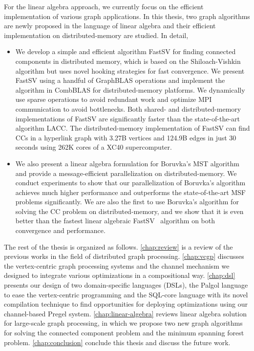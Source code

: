 \documentclass{sokendai_thesis} %
\newcommand{\boruvka}[0]{Boruvka}
\begin{document}
For the linear algebra approach, we currently focus on the efficient implementation of various graph applications.
In this thesis, two graph algorithms are newly proposed in the language of linear algebra and their efficient implementation on distributed-memory are studied. In detail,
\begin{itemize}
\item
  We develop a simple and efficient algorithm FastSV for finding connected components in distributed memory, which is based on the Shiloach-Vishkin algorithm but uses novel hooking strategies for fast convergence.
  We present FastSV using a handful of GraphBLAS operations and implement the algorithm in CombBLAS for distributed-memory platforms.
  We dynamically use sparse operations to avoid redundant work and optimize MPI communication to avoid bottlenecks.
  Both shared- and distributed-memory implementations of FastSV are significantly faster than the state-of-the-art algorithm LACC.
  The distributed-memory implementation of FastSV can find CCs in a hyperlink graph with 3.27B vertices and 124.9B edges in just $30$ seconds using 262K cores of a XC40 supercomputer. 

\item
  We also present a linear algebra formulation for \boruvka{}'s MST algorithm and provide a message-efficient parallelization on distributed-memory.
  We conduct experiments to show that our parallelization of \boruvka{}'s algorithm achieves much higher performance and outperforms the state-of-the-art MSF problems significantly.
  We are also the first to use \boruvka{}'s algorithm for solving the CC problem on distributed-memory, and we show that it is even better than the fastest linear algebraic FastSV~\cite{fastsv} algorithm on both convergence and performance.

\end{itemize}

The rest of the thesis is organized as follows.
\autoref{chap:review} is a review of the previous works in the field of distributed graph processing.
\autoref{chap:vcgp} discusses the vertex-centric graph processing systems and the channel mechanism we designed to integrate various optimizations in a compositional way.
\autoref{chap:dsl} presents our design of two domain-specific languages (DSLs), the Palgol language to ease the vertex-centric programming and the SQL-core language with its novel compilation technique to find opportunities for deploying optimizations using our channel-based Pregel system.
\autoref{chap:linear-algebra} reviews linear algebra solution for large-scale graph processing, in which we propose two new graph algorithms for solving the connected component problem and the minimum spanning forest problem.
\autoref{chap:conclusion} conclude this thesis and discuss the future work.
\end{document}
